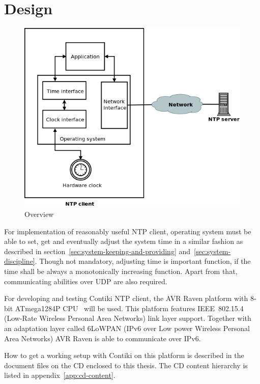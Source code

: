 
\chapter{Design}
\begin{figure}
  \centering
  \includegraphics[width=13cm,keepaspectratio]{fig/design.png}
  \caption{Overview} %
\end{figure}

For implementation of reasonably useful NTP client,
operating system must be able to set, get
and eventually adjust the system time in a similar fashion as
described in section~\ref{sec:system-keeping-and-providing} and~\ref{sec:system-discipline}.
Though not mandatory, adjusting time is important function,
if the time shall be always a monotonically increasing function.
Apart from that, communicating abilities over UDP are also required.

For developing and testing Contiki NTP client,
the AVR Raven platform with 8-bit ATmega1284P CPU~\cite{avr-datasheet} will be used.
This platform features IEEE~802.15.4 (Low-Rate Wireless Personal Area Networks) link layer support.
Together with an adaptation layer called 6LoWPAN (IPv6 over Low power Wireless Personal Area Networks)
AVR Raven is able to communicate over IPv6.

How to get a working setup with Contiki on this platform is described in
the document files on the CD enclosed to this thesis.
The CD content hierarchy is listed in appendix~\ref{app:cd-content}.








%
